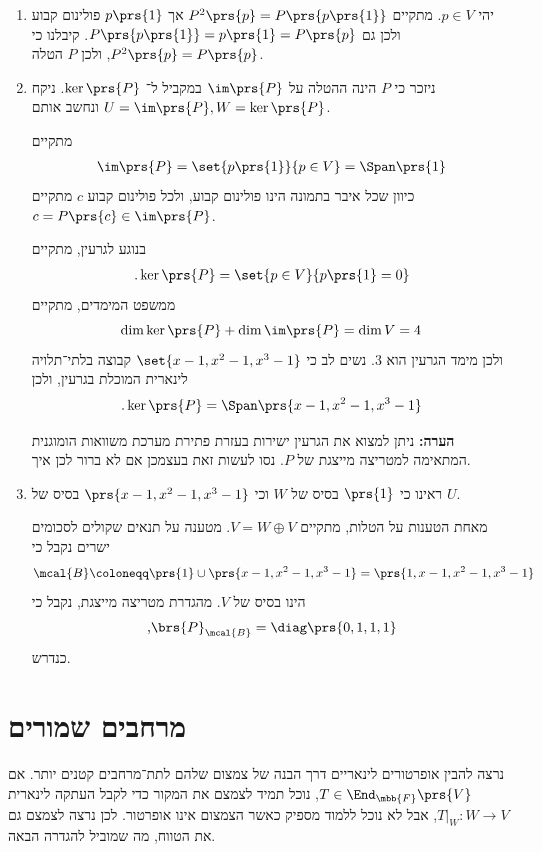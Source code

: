 \documentclass[a4paper,10pt,twoside,openany]{book}
\begin{document}
\begin{solution}
\begin{enumerate}
\item יהי
$p \in V$.
מתקיים
$P^2\prs{p} = P\prs{p\prs{1}}$
אך
$p\prs{1}$
פולינום קבוע ולכן גם
$P\prs{p\prs{1}} = p\prs{1} = P\prs{p}$.
קיבלנו כי
$P^2\prs{p} = P\prs{p}$,
ולכן
$P$
הטלה.

\item
ניזכר כי
$P$
הינה ההטלה על
$\im\prs{P}$
במקביל ל־%
$\ker\prs{P}$.
ניקח
$U = \im\prs{P}, W = \ker\prs{P}$
ונחשב אותם.

מתקיים
\begin{align*}
\im\prs{P} = \set{p\prs{1}}{p \in V} = \Span\prs{1}
\end{align*}
כיוון שכל איבר בתמונה הינו פולינום קבוע, ולכל פולינום קבוע
$c$
מתקיים
$c = P\prs{c} \in \im\prs{P}$.

בנוגע לגרעין, מתקיים
\begin{align*}
\text{.} \ker\prs{P} = \set{p \in V}{p\prs{1} = 0}
\end{align*}
ממשפט המימדים, מתקיים
\[\dim \ker\prs{P} + \dim \im\prs{P} = \dim V = 4\]
ולכן מימד הגרעין הוא
$3$.
נשים לב כי
$\set{x-1, x^2-1, x^3-1}$
קבוצה בלתי־תלויה לינארית המוכלת בגרעין, ולכן
\begin{align*}
\text{.} \ker\prs{P} = \Span\prs{x-1, x^2 - 1, x^3 - 1}
\end{align*}

\textbf{הערה:} ניתן למצוא את הגרעין ישירות בעזרת פתירת מערכת משוואות הומוגנית המתאימה למטריצה מייצגת של
$P$.
נסו לעשות זאת בעצמכן אם לא ברור לכן איך.

\item
ראינו כי
$\prs{1}$
בסיס של
$W$
וכי
$\prs{x-1, x^2 - 1, x^3 - 1}$
בסיס של
$U$.

מאחת הטענות על הטלות, מתקיים
$V = W \oplus V$.
מטענה על תנאים שקולים לסכומים ישרים נקבל כי
\[\mcal{B} \coloneqq \prs{1} \cup \prs{x-1, x^2 - 1, x^3 - 1} = \prs{1, x-1, x^2 - 1, x^3 - 1}\]
הינו בסיס של
$V$.
מהגדרת מטריצה מייצגת, נקבל כי
\begin{align*}
\text{,} \brs{P}_{\mcal{B}} = \diag\prs{0, 1, 1, 1}
\end{align*}
כנדרש.
\end{enumerate}
\end{solution}

\section{מרחבים שמורים}

נרצה להבין אופרטורים לינאריים דרך הבנה של צמצום שלהם לתת־מרחבים קטנים יותר.
אם
$T \in \End_{\mbb{F}}\prs{V}$,
נוכל תמיד לצמצם את המקור כדי לקבל העתקה לינארית
$\left. T \right|_{W} \colon W \to V$,
אבל לא נוכל ללמוד מספיק כאשר הצמצום אינו אופרטור. לכן נרצה לצמצם גם את הטווח, מה שמוביל להגדרה הבאה.
\end{document}
